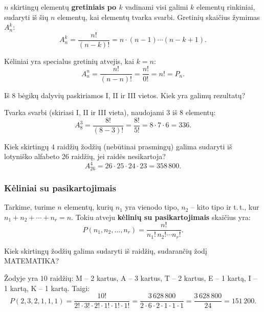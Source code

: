 \begin{definition}[Gretiniai]
$n$ skirtingų elementų \textbf{gretiniais po $k$} vadinami visi galimi $k$ elementų rinkiniai, sudaryti iš šių $n$ elementų, kai elementų tvarka svarbi. Gretinių skaičius žymimas $A_n^k$:
\[
A_n^k = \frac{n!}{(n-k)!} = n \cdot (n-1) \cdots (n-k+1).
\]
\end{definition}

\begin{remark}
Kėliniai yra specialus gretinių atvejis, kai $k = n$:
\[
A_n^n = \frac{n!}{(n-n)!} = \frac{n!}{0!} = n! = P_n.
\]
\end{remark}

\begin{example}
Iš $8$ bėgikų dalyvių paskiriamos I, II ir III vietos. Kiek yra galimų rezultatų?

Tvarka svarbi (skiriasi I, II ir III vieta), naudojami $3$ iš $8$ elementų:
\[
A_8^3 = \frac{8!}{(8-3)!} = \frac{8!}{5!} = 8 \cdot 7 \cdot 6 = 336.
\]
\end{example}

\begin{example}
Kiek skirtingų $4$ raidžių žodžių (nebūtinai prasmingų) galima sudaryti iš lotyniško alfabeto 26 raidžių, jei raidės nesikartoja?
\[
A_{26}^{4} = 26 \cdot 25 \cdot 24 \cdot 23 = 358\,800.
\]
\end{example}

\subsubsection*{Kėliniai su pasikartojimais}

\begin{definition}
Tarkime, turime $n$ elementų, kurių $n_1$ yra vienodo tipo, $n_2$ -- kito tipo ir t.\,t., kur $n_1 + n_2 + \cdots + n_r = n$. Tokiu atveju \textbf{kėlinių su pasikartojimais} skaičius yra:
\[
P(n_1, n_2, \ldots, n_r) = \frac{n!}{n_1!\, n_2! \cdots n_r!}.
\]
\end{definition}

\begin{example}
Kiek skirtingų žodžių galima sudaryti iš raidžių, sudarančių žodį \textsc{MATEMATIKA}?

Žodyje yra $10$ raidžių: M -- 2 kartus, A -- 3 kartus, T -- 2 kartus, E -- 1 kartą, I -- 1 kartą, K -- 1 kartą. Taigi:
\[
P(2, 3, 2, 1, 1, 1) = \frac{10!}{2!\cdot 3!\cdot 2!\cdot 1!\cdot 1!\cdot 1!} = \frac{3\,628\,800}{2 \cdot 6 \cdot 2 \cdot 1 \cdot 1 \cdot 1} = \frac{3\,628\,800}{24} = 151\,200.
\]
\end{example}

